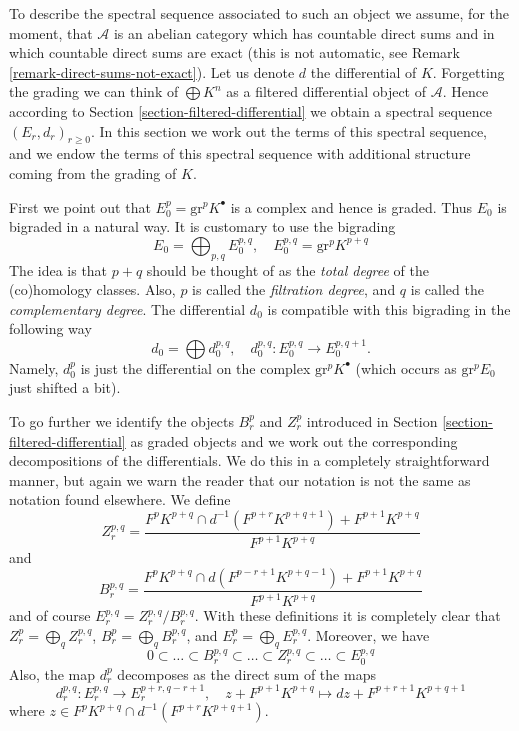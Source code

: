\medskip\noindent
To describe the spectral sequence associated to such an object
we assume, for the moment, that $\mathcal{A}$ is an abelian category
which has countable direct sums and in which countable direct sums are exact
(this is not automatic, see Remark \ref{remark-direct-sums-not-exact}).
Let us denote $d$ the differential of $K$. Forgetting the grading
we can think of $\bigoplus K^n$ as a filtered differential object of
$\mathcal{A}$. Hence according to Section \ref{section-filtered-differential}
we obtain a spectral sequence $(E_r, d_r)_{r \geq 0}$. In this section
we work out the terms of this spectral sequence, and we endow the terms
of this spectral sequence with additional structure coming from the
grading of $K$.

\medskip\noindent
First we point out that $E_0^p = \text{gr}^p K^\bullet$ is a
complex and hence is graded. Thus $E_0$ is bigraded in a natural
way. It is customary to use the bigrading
$$
E_0 = \bigoplus\nolimits_{p, q} E_0^{p, q},
\quad
E_0^{p, q} = \text{gr}^p K^{p + q}
$$
The idea is that $p + q$ should be thought of as the {\it total degree} of
the (co)homology classes. Also, $p$ is called the {\it filtration degree},
and $q$ is called the {\it complementary degree}.
The differential $d_0$ is compatible with this
bigrading in the following way
$$
d_0  = \bigoplus d_0^{p, q},
\quad
d_0^{p, q} : E_0^{p, q} \to E_0^{p, q + 1}.
$$
Namely, $d_0^p$ is just the differential on the complex
$\text{gr}^p K^\bullet$ (which occurs as $\text{gr}^pE_0$ just shifted
a bit).

\medskip\noindent
To go further we identify the objects $B_r^p$ and $Z_r^p$ introduced
in Section \ref{section-filtered-differential} as graded objects and
we work out the corresponding decompositions of the differentials.
We do this in a completely straightforward manner, but again we warn
the reader that our notation is not the same as notation found
elsewhere. We define
$$
Z_r^{p, q} =
\frac{F^pK^{p + q} \cap d^{-1}(F^{p + r}K^{p + q + 1}) + F^{p + 1}K^{p + q}}
{F^{p + 1}K^{p + q}}
$$
and
$$
B_r^{p, q} =
\frac{F^pK^{p + q} \cap d(F^{p - r + 1}K^{p + q - 1}) + F^{p + 1}K^{p + q}}
{F^{p + 1}K^{p + q}}
$$
and of course $E_r^{p, q} = Z_r^{p, q}/B_r^{p, q}$.
With these definitions it is completely clear that
$Z_r^p = \bigoplus_q Z_r^{p, q}$,
$B_r^p = \bigoplus_q B_r^{p, q}$, and
$E_r^p = \bigoplus_q E_r^{p, q}$. Moreover, we have
$$
0 \subset \ldots \subset B_r^{p, q} \subset
\ldots
\subset Z_r^{p, q} \subset \ldots \subset E_0^{p, q}
$$
Also, the map $d_r^p$ decomposes as the direct sum of the maps
$$
d_r^{p, q} : E_r^{p, q} \longrightarrow E_r^{p + r, q - r + 1},
\quad
z + F^{p + 1}K^{p + q}
\mapsto
dz + F^{p + r + 1}K^{p + q + 1}
$$
where $z \in F^pK^{p + q} \cap d^{-1}(F^{p + r}K^{p + q + 1})$.

